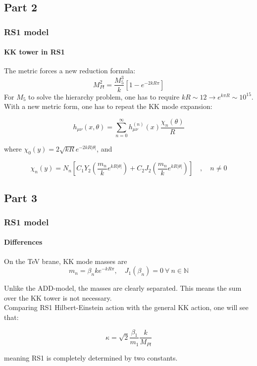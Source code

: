 \documentclass[10pt]{beamer}
\begin{document}
	\subsection{Part 2}
	\begin{frame}
		\frametitle{RS1 model}
		\framesubtitle{KK tower in RS1}
		The metric forces a new reduction formula:
		\begin{equation}
			M_{Pl}^2 = \frac{M_5^3}{k}\left[1-e^{-2kR\pi}\right]
		\end{equation}
		For $M_5$ to solve the hierarchy problem, one has to require $kR \sim 12 \rightarrow e^{k\pi R} \sim 10^{15}$.\\
		
		With a new metric form, one has to repeat the KK mode expansion:
		
		\begin{equation}
			h_{\mu\nu}(x,\theta) = \sum_{n=0}^\infty h_{\mu\nu}^{(n)}(x)\frac{\chi_n(\theta)}{R}
		\end{equation}
		
		where $\chi_0(y) = 2\sqrt{kR}e^{-2kR|\theta|}$, and
		
		\begin{equation}
			\chi_n(y) = N_n\left[ C_1Y_2\left(\frac{m_n}{k}e^{kR|\theta|}\right) +   C_2J_2\left(\frac{m_n}{k}e^{kR|\theta|}\right)\right] \quad,\quad n\neq 0
		\end{equation}
	\end{frame}
	
	\subsection{Part 3}
	\begin{frame}
		\frametitle{RS1 model}
		\framesubtitle{Differences}
		On the TeV brane, KK mode masses are
		\begin{equation}
			m_n = \beta_n ke^{-kR\pi}, \quad J_1(\beta_n) = 0\:\forall\: n\in\mathbb{N}
		\end{equation}
		
		Unlike the ADD-model, the masses are clearly separated. This means the sum over the KK tower is not necessary.\\
		Comparing RS1 Hilbert-Einstein action with the general KK action, one will see that:
		
		\begin{equation}
			\kappa = \sqrt{2}\frac{\beta_1}{m_1}\frac{k}{M_{Pl}}
		\end{equation}
		
		meaning RS1 is completely determined by two constants.
	\end{frame}
	
\end{document}
